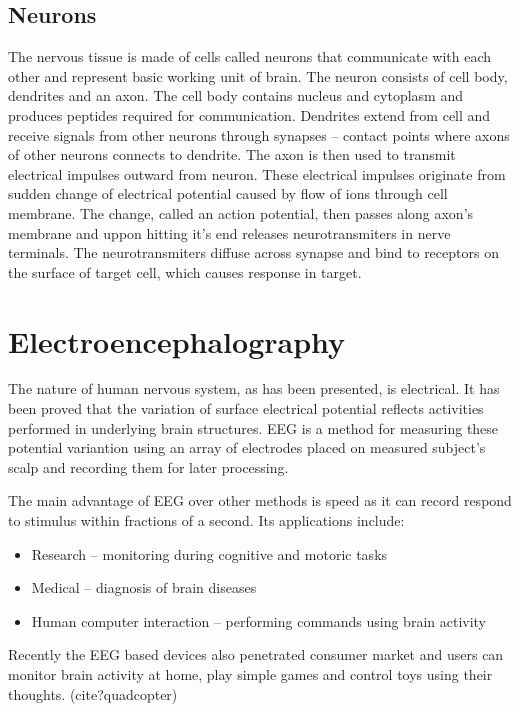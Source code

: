 \subsection{Neurons}
The nervous tissue is made of cells called neurons that communicate with each
other and represent basic working unit of brain. The neuron consists of cell
body, dendrites and an axon. The cell body contains nucleus and cytoplasm and
produces peptides required for communication. Dendrites extend from cell and
receive signals from other neurons through synapses -- contact points where
axons of other neurons connects to dendrite. The axon is then used to transmit
electrical impulses outward from neuron. These electrical impulses originate
from sudden change of electrical potential caused by flow of ions through cell
membrane. The change, called an action potential, then passes along axon's
membrane and uppon hitting it's end releases neurotransmiters in nerve
terminals. The neurotransmiters diffuse across synapse and bind to receptors on
the surface of target cell, which causes response in target.\cite{brainFacts}

\section{Electroencephalography}
The nature of human nervous system, as has been presented, is electrical. It has
been proved that the variation of surface electrical potential reflects
activities performed in underlying brain structures. EEG is a method for
measuring these potential variantion using an array of electrodes placed on
measured subject's scalp and recording them for later processing.\cite{eegClass}

The main advantage of EEG over other methods is speed as it can record respond
to stimulus within fractions of a second.\cite{eegFund} Its applications include:
\begin{itemize}
  \item Research -- monitoring during cognitive and motoric tasks
  \item Medical -- diagnosis of brain diseases
  \item Human computer interaction -- performing commands using brain activity  
\end{itemize}
Recently the EEG based devices also penetrated consumer market and users can
monitor brain activity at home, play simple games and control toys using
their thoughts. (cite?quadcopter)

